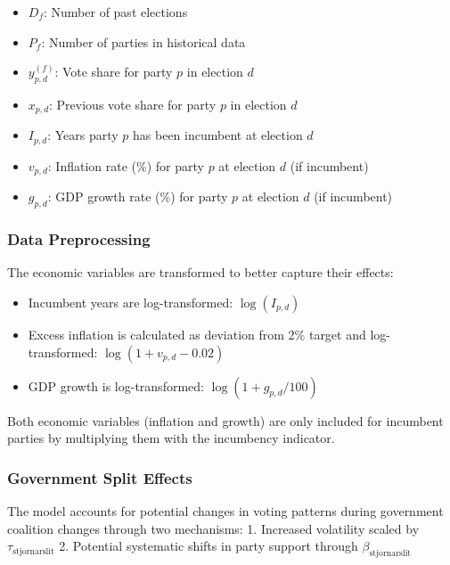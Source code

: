 \documentclass[
  letterpaper,
  DIV=11,
  numbers=noendperiod]{scrartcl}
\providecommand{\tightlist}{%
  \setlength{\itemsep}{0pt}\setlength{\parskip}{0pt}}\usepackage{longtable,booktabs,array}
\begin{document}
\begin{itemize}
\tightlist
\item
  \(D_f\): Number of past elections
\item
  \(P_f\): Number of parties in historical data
\item
  \(y_{p,d}^{(f)}\): Vote share for party \(p\) in election \(d\)
\item
  \(x_{p,d}\): Previous vote share for party \(p\) in election \(d\)
\item
  \(I_{p,d}\): Years party \(p\) has been incumbent at election \(d\)
\item
  \(v_{p,d}\): Inflation rate (\%) for party \(p\) at election \(d\) (if
  incumbent)
\item
  \(g_{p,d}\): GDP growth rate (\%) for party \(p\) at election \(d\)
  (if incumbent)
\end{itemize}

\subsubsection{Data Preprocessing}\label{data-preprocessing}

The economic variables are transformed to better capture their effects:

\begin{itemize}
\tightlist
\item
  Incumbent years are log-transformed: \(\log(I_{p,d})\)
\item
  Excess inflation is calculated as deviation from 2\% target and
  log-transformed: \(\log(1 + v_{p,d} - 0.02)\)
\item
  GDP growth is log-transformed: \(\log(1 + g_{p,d}/100)\)
\end{itemize}

Both economic variables (inflation and growth) are only included for
incumbent parties by multiplying them with the incumbency indicator.

\subsubsection{Government Split Effects}\label{government-split-effects}

The model accounts for potential changes in voting patterns during
government coalition changes through two mechanisms: 1. Increased
volatility scaled by \(\tau_\text{stjornarslit}\) 2. Potential
systematic shifts in party support through \(\beta_\text{stjornarslit}\)
\end{document}
